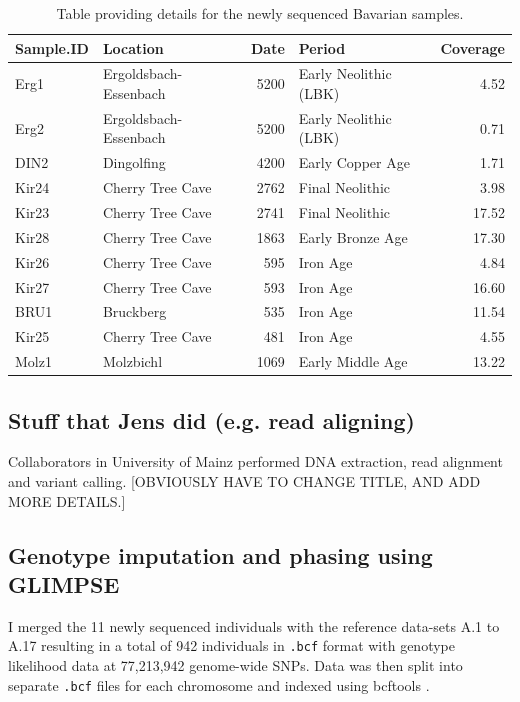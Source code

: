 \begin{table}
\small
\centering
\begin{tabular}{l|l|r|l|r}
\hline
Sample.ID & Location & Date & Period & Coverage \\
\hline
Erg1 & Ergoldsbach-Essenbach & 5200 & Early Neolithic (LBK) & 4.52\\
\hline
Erg2 & Ergoldsbach-Essenbach & 5200 & Early Neolithic (LBK) & 0.71\\
\hline
DIN2 & Dingolfing & 4200 & Early Copper Age & 1.71\\
\hline
Kir24 & Cherry Tree Cave & 2762 & Final Neolithic & 3.98\\
\hline
Kir23 & Cherry Tree Cave & 2741 & Final Neolithic & 17.52\\
\hline
Kir28 & Cherry Tree Cave & 1863 & Early Bronze Age & 17.30\\
\hline
Kir26 & Cherry Tree Cave & 595 & Iron Age & 4.84\\
\hline
Kir27 & Cherry Tree Cave & 593 & Iron Age & 16.60\\
\hline
BRU1 & Bruckberg & 535 & Iron Age & 11.54\\
\hline
Kir25 & Cherry Tree Cave & 481 & Iron Age & 4.55\\
\hline
Molz1 & Molzbichl & 1069 & Early Middle Age & 13.22\\
\hline
\end{tabular}
\caption{Table providing details for the newly sequenced Bavarian samples.}
\end{table}

\subsection{Stuff that Jens did (e.g. read aligning)}

Collaborators in University of Mainz performed DNA extraction, read alignment and variant calling. {\color{red}[OBVIOUSLY HAVE TO CHANGE TITLE, AND ADD MORE DETAILS.]}

\subsection{Genotype imputation and phasing using GLIMPSE}
\label{sssec:imputationphasingGLIMPSE}


I merged the 11 newly sequenced individuals with the reference data-sets A.1 to A.17 resulting in a total of 942 individuals in \texttt{.bcf} format with genotype likelihood data at 77,213,942 genome-wide SNPs. Data was then split into separate \texttt{.bcf} files for each chromosome and indexed using bcftools \cite{li2009sequence}.

